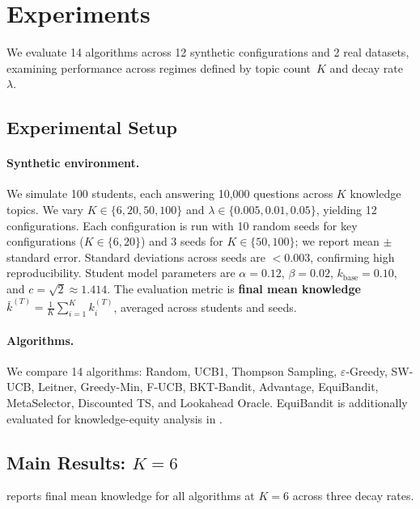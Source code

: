 \section{Experiments}
\label{sec:experiments}

We evaluate 14 algorithms across 12 synthetic configurations and 2 real datasets, examining performance across regimes defined by topic count~$K$ and decay rate~$\lambda$.

\subsection{Experimental Setup}
\label{sec:setup}

\paragraph{Synthetic environment.}
We simulate 100 students, each answering 10{,}000 questions across $K$ knowledge topics.
We vary $K \in \{6, 20, 50, 100\}$ and $\lambda \in \{0.005, 0.01, 0.05\}$, yielding 12 configurations.
Each configuration is run with 10 random seeds for key configurations ($K \in \{6, 20\}$) and 3 seeds for $K \in \{50, 100\}$; we report mean $\pm$ standard error. Standard deviations across seeds are $<0.003$, confirming high reproducibility.
Student model parameters are $\alpha = 0.12$, $\beta = 0.02$, $k_{\mathrm{base}} = 0.10$, and $c = \sqrt{2} \approx 1.414$.
The evaluation metric is \textbf{final mean knowledge} $\bar{k}^{(T)} = \frac{1}{K}\sum_{i=1}^{K} k_i^{(T)}$, averaged across students and seeds.

\paragraph{Algorithms.}
We compare 14 algorithms: Random, UCB1, Thompson Sampling, $\varepsilon$-Greedy, SW-UCB, Leitner, Greedy-Min, F-UCB, BKT-Bandit, Advantage, EquiBandit, MetaSelector, Discounted TS, and Lookahead Oracle.
EquiBandit is additionally evaluated for knowledge-equity analysis in .

\subsection{Main Results: $K{=}6$}
\label{sec:main_results}

 reports final mean knowledge for all algorithms at $K{=}6$ across three decay rates.

\begin{table}[t]
\centering
\caption{Final mean knowledge at $K{=}6$ for all algorithms across three decay rates $\lambda$.
Bold indicates the best result; underline indicates second-best.
Results averaged over 100 students and 10 seeds.}
\label{tab:main}

\end{table}

